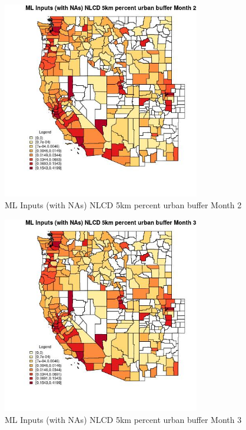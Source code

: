 \begin{figure} 
\centering  
\includegraphics[width=0.77\textwidth]{Code_Outputs/Report_ML_input_PM25_Step4_part_f_de_duplicated_aves_prioritize_24hr_obswNAs_CountyNLCD_5km_percent_urban_buffermedianMonth2.jpg} 
\caption{\label{fig:Report_ML_input_PM25_Step4_part_f_de_duplicated_aves_prioritize_24hr_obswNAsCountyNLCD_5km_percent_urban_buffermedianMonth2}ML Inputs (with NAs) NLCD 5km percent urban buffer Month 2} 
\end{figure} 
 

\begin{figure} 
\centering  
\includegraphics[width=0.77\textwidth]{Code_Outputs/Report_ML_input_PM25_Step4_part_f_de_duplicated_aves_prioritize_24hr_obswNAs_CountyNLCD_5km_percent_urban_buffermedianMonth3.jpg} 
\caption{\label{fig:Report_ML_input_PM25_Step4_part_f_de_duplicated_aves_prioritize_24hr_obswNAsCountyNLCD_5km_percent_urban_buffermedianMonth3}ML Inputs (with NAs) NLCD 5km percent urban buffer Month 3} 
\end{figure} 
 

